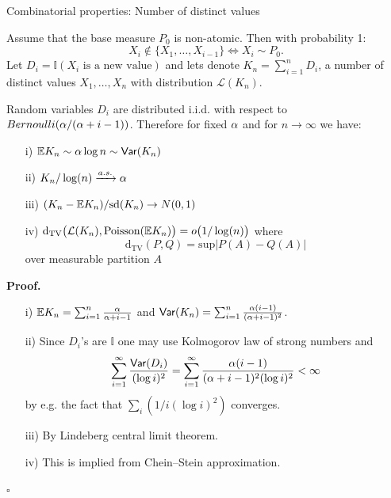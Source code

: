 \begin{frame}[allowframebreaks]{Combinatorial properties: Number of distinct values}

Assume that the base measure $P_0$ is non-atomic. Then  with probability 1:
$$
X_i\notin\{X_1,\ldots, X_{i-1}\} \Leftrightarrow X_i \sim P_0.
$$
Let $D_i =  \mathbb{I}(X_i \text{ is a new value})$ and lets denote $K_n=\sum_{i=1}^nD_i$, a number of distinct values $X_1,\ldots, X_n$ with distribution $\mathcal{L}(K_n)$.
\begin{proposition}
Random variables $D_i$ are distributed i.i.d. with respect to $Bernoulli(\alpha/(\alpha + i - 1))$. Therefore for fixed $\alpha$ and for $n\rightarrow \infty$ we have:
\begin{enumerate}
    \item[i)] $\mathbb{E} K_n\sim \alpha \log n \sim \mathsf{Var}(K_n)$
    \item[ii)] $K_n/\log(n)\xrightarrow{a.s.} \alpha$
    \item[iii)] $(K_n - \mathbb{E} K_n)/\text{sd}(K_n)\rightarrow N(0,1) $
    \item[iv)] $\text{d}_{\text{TV}}\big( \mathcal{L}(K_n), \text{Poisson}(\mathbb{E} K_n) \big)=o \big(1 / \log(n)\big)$ where $$
    \text{d}_{\text{TV}}(P,Q)=\text{sup}|P(A)-Q(A)|
    $$
    over measurable  partition $A$
\end{enumerate}
\end{proposition}

\framebreak

\textbf{Proof.}
\begin{enumerate}
    \item[i)] $\mathbb{E} K_n = \sum_{i=1}^n \frac{\alpha}{\alpha+i-1} $ and $ \mathsf{Var}(K_n) = \sum_{i=1}^n\frac{\alpha(i-1)}{(\alpha + i -1)^2}$.
    \item[ii)] Since $D_i$'s are $\mathbb{I}$ one may use Kolmogorov law of strong numbers and 
    $$
    \sum_{i=1}^\infty \frac{\mathsf{Var} (D_i)}{ (\log i)^2 }= \sum_{i=1}^\infty \frac{\alpha(i-1)}{(\alpha +i-1)^2 (\log i)^2}<\infty$$
    by e.g. the fact that $\sum_i (1/i(\log i)^2)$ converges.
    \item[iii)]By Lindeberg central limit theorem.
    \item[iv)] This is implied from Chein--Stein approximation. %
\end{enumerate}
\hfill $\square$
\framebreak


\end{frame}

